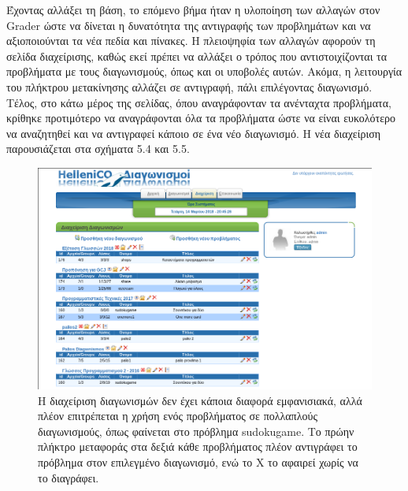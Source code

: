 \documentclass[diploma]{softlab-thesis}
\begin{document}
Έχοντας αλλάξει τη βάση, το επόμενο βήμα ήταν η υλοποίηση των αλλαγών στον
Grader ώστε να δίνεται η δυνατότητα της αντιγραφής των προβλημάτων και να
αξιοποιούνται τα νέα πεδία και πίνακες. Η πλειοψηφία των αλλαγών αφορούν τη
σελίδα διαχείρισης, καθώς εκεί πρέπει να αλλάξει ο τρόπος που αντιστοιχίζονται
τα προβλήματα με τους διαγωνισμούς, όπως και οι υποβολές αυτών. Ακόμα, η
λειτουργία του πλήκτρου μετακίνησης αλλάζει σε αντιγραφή, πάλι επιλέγοντας
διαγωνισμό. Τέλος, στο κάτω μέρος της σελίδας, όπου αναγράφονταν τα ανένταχτα
προβλήματα, κρίθηκε προτιμότερο να αναγράφονται όλα τα προβλήματα ώστε να είναι
ευκολότερο να αναζητηθεί και να αντιγραφεί κάποιο σε ένα νέο διαγωνισμό. Η νέα
διαχείριση παρουσιάζεται στα σχήματα 5.4 και 5.5.

\bigskip

\begin{figure}
  \centering
  \includegraphics[scale=0.5,trim=4 4 4 4,clip]{Figures/aftersep.png}
  \caption[Διαχείριση διαγωνισμών με αντιγραφή προβλημάτων]{Η διαχείριση διαγωνισμών
  δεν έχει κάποια διαφορά εμφανισιακά, αλλά πλέον επιτρέπεται η χρήση ενός
  προβλήματος σε πολλαπλούς διαγωνισμούς, όπως φαίνεται στο πρόβλημα sudokugame.
  Το πρώην πλήκτρο μεταφοράς στα δεξιά κάθε προβλήματος πλέον αντιγράφει το πρόβλημα
  στον επιλεγμένο διαγωνισμό, ενώ το X το αφαιρεί χωρίς να το διαγράφει.}
\end{figure}
\end{document}
